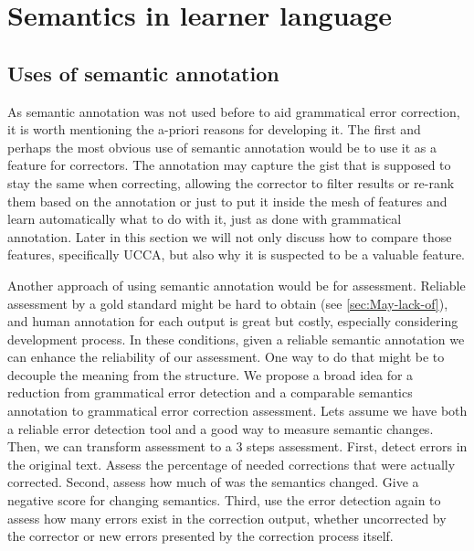 \documentclass[11pt]{article}
\begin{document}
\section{Semantics in learner language}

\subsection{Uses of semantic annotation}

As semantic annotation was not used before to aid grammatical error
correction, it is worth mentioning the a-priori reasons for developing
it. The first and perhaps the most obvious use of semantic annotation
would be to use it as a feature for correctors. The annotation may
capture the gist that is supposed to stay the same when correcting,
allowing the corrector to filter results or re-rank them based on
the annotation or just to put it inside the mesh of features and learn
automatically what to do with it, just as done with grammatical annotation.
Later in this section we will not only discuss how to compare those
features, specifically UCCA, but also why it is suspected to be a
valuable feature.

Another approach of using semantic annotation would be for assessment.
Reliable assessment by a gold standard might be hard to obtain (see
\ref{sec:May-lack-of}), and human annotation for each output is great\cite{madnani2011they}
but costly, especially considering development process. In these conditions,
given a reliable semantic annotation we can enhance the reliability
of our assessment. One way to do that might be to decouple the meaning
from the structure. We propose a broad idea for a reduction from grammatical
error detection and a comparable semantics annotation to grammatical
error correction assessment. Lets assume we have both a reliable error
detection tool and a good way to measure semantic changes. Then, we
can transform assessment to a 3 steps assessment. First, detect errors
in the original text. Assess the percentage of needed corrections
that were actually corrected. Second, assess how much of was the semantics
changed. Give a negative score for changing semantics. Third, use
the error detection again to assess how many errors exist in the correction
output, whether uncorrected by the corrector or new errors presented
by the correction process itself. \\
\end{document}
